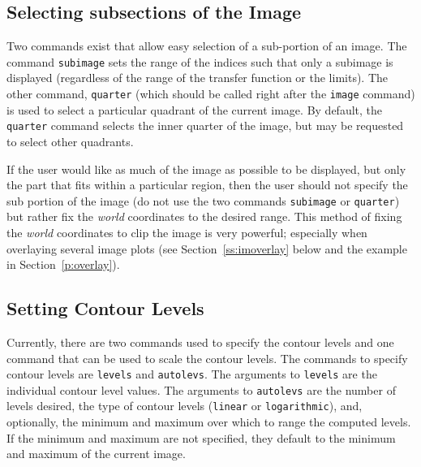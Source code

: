 \subsection*		{Selecting subsections of the Image}

Two commands exist that allow easy selection of a sub-portion of an image.
The command
{\tt subimage}%
sets the range of the indices such that only a subimage is displayed
(regardless of the range of the transfer function or the limits).
The other command,
{\tt quarter}%
(which should be called right after the {\tt image} command)
is used to select a
particular quadrant of the current image.
By default, the {\tt quarter} command selects the inner quarter of the image,
but may be requested to select other quadrants.

If the user would like as much of the image as possible to be displayed,
but only the part that fits within a particular region, then the user
should not specify the sub portion of the image (\ie do not use the
two commands {\tt subimage} or {\tt quarter}) but rather fix
the {\em world} coordinates
to the desired range.
This method of fixing the {\em world} coordinates to clip the image is very
powerful; especially when overlaying several image plots
(see Section~\ref{ss:imoverlay} below and
the example in Section~\ref{p:overlay}).

\subsection*		{Setting Contour Levels}

Currently, there are two commands used to specify the contour levels and
one command that can be used to scale the contour levels.
The commands to specify contour levels are
{\tt levels}%
%
%
and
{\tt autolevs}.%
%
%
The arguments to {\tt levels} are the individual contour level values.
The arguments to {\tt autolevs} are the number of levels desired, the
type of contour levels ({\tt linear} or {\tt logarithmic}), and,
optionally, the minimum and maximum over which to range the computed levels.
If the minimum and maximum are not specified, they default to the
minimum and maximum of the current image.

